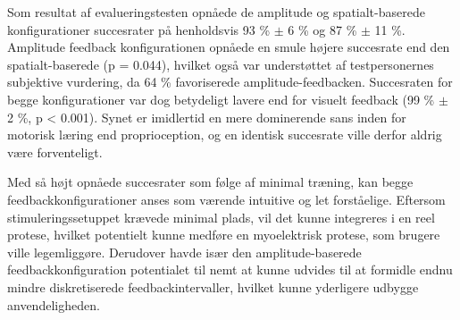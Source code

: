 Som resultat af evalueringstesten opnåede de amplitude og spatialt-baserede konfigurationer succesrater på henholdsvis 93 \% $\pm$ 6 \% og 87 \% $\pm$ 11 \%. Amplitude feedback konfigurationen opnåede en smule højere succesrate end den spatialt-baserede (p = 0.044), hvilket også var understøttet af testpersonernes subjektive vurdering, da 64 \% favoriserede amplitude-feedbacken. Succesraten for begge konfigurationer var dog betydeligt lavere end for visuelt feedback (99 \% $\pm$ 2 \%, p < 0.001). Synet er imidlertid en mere dominerende sans inden for motorisk læring end proprioception, og en identisk succesrate ville derfor aldrig være forventeligt. 

Med så højt opnåede succesrater som følge af minimal træning, kan begge feedbackkonfigurationer anses som værende intuitive og let forståelige. Eftersom stimuleringssetuppet krævede minimal plads, vil det kunne integreres i en reel protese, hvilket potentielt kunne medføre en myoelektrisk protese, som brugere ville legemliggøre. Derudover havde især den amplitude-baserede feedbackkonfiguration potentialet til nemt at kunne udvides til at formidle endnu mindre diskretiserede feedbackintervaller, hvilket kunne yderligere udbygge anvendeligheden.

